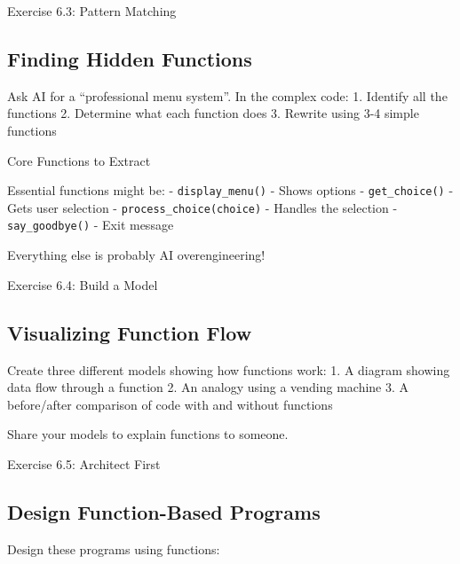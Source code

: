 \documentclass[
  letterpaper,
  DIV=11,
  numbers=noendperiod,
  oneside]{scrreprt}
\begin{document}
Exercise 6.3: Pattern Matching

\subsection{Finding Hidden Functions}\label{finding-hidden-functions}

Ask AI for a ``professional menu system''. In the complex code: 1.
Identify all the functions 2. Determine what each function does 3.
Rewrite using 3-4 simple functions

Core Functions to Extract

Essential functions might be: - \texttt{display\_menu()} - Shows options
- \texttt{get\_choice()} - Gets user selection -
\texttt{process\_choice(choice)} - Handles the selection -
\texttt{say\_goodbye()} - Exit message

Everything else is probably AI overengineering!

Exercise 6.4: Build a Model

\subsection{Visualizing Function Flow}\label{visualizing-function-flow}

Create three different models showing how functions work: 1. A diagram
showing data flow through a function 2. An analogy using a vending
machine 3. A before/after comparison of code with and without functions

Share your models to explain functions to someone.

Exercise 6.5: Architect First

\subsection{Design Function-Based
Programs}\label{design-function-based-programs}

Design these programs using functions:
\end{document}
